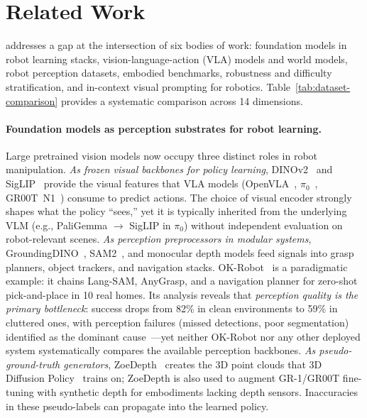 \section{Related Work}\label{sec:related}

\coolname{} addresses a gap at the intersection of six bodies of work: foundation models in robot learning stacks, vision-language-action (VLA) models and world models, robot perception datasets, embodied benchmarks, robustness and difficulty stratification, and in-context visual prompting for robotics.
Table~\ref{tab:dataset-comparison} provides a systematic comparison across 14 dimensions.

\paragraph{Foundation models as perception substrates for robot learning.}
Large pretrained vision models now occupy three distinct roles in robot manipulation.
%
\textit{As frozen visual backbones for policy learning}, DINOv2~\citep{oquab2023dinov2} and SigLIP~\citep{zhai2023siglip} provide the visual features that VLA models (OpenVLA~\citep{kim2024openvla}, $\pi_0$~\citep{black2024pi0}, GR00T~N1~\citep{bjorck2025gr00t}) consume to predict actions.
The choice of visual encoder strongly shapes what the policy ``sees,'' yet it is typically inherited from the underlying VLM (e.g., PaliGemma $\to$ SigLIP in $\pi_0$) without independent evaluation on robot-relevant scenes.
%
\textit{As perception preprocessors in modular systems}, GroundingDINO~\citep{liu2024groundingDINO}, SAM2~\citep{ravi2024sam2}, and monocular depth models feed signals into grasp planners, object trackers, and navigation stacks.
OK-Robot~\citep{liu2024okrobot} is a paradigmatic example: it chains Lang-SAM, AnyGrasp, and a navigation planner for zero-shot pick-and-place in 10 real homes.
Its analysis reveals that \textit{perception quality is the primary bottleneck}: success drops from 82\% in clean environments to 59\% in cluttered ones, with perception failures (missed detections, poor segmentation) identified as the dominant cause~\citep{liu2024okrobot}---yet neither OK-Robot nor any other deployed system systematically compares the available perception backbones.
%
\textit{As pseudo-ground-truth generators}, ZoeDepth~\citep{bhat2023zoedepth} creates the 3D point clouds that 3D Diffusion Policy~\citep{ze2024dp3} trains on; ZoeDepth is also used to augment GR-1/GR00T fine-tuning with synthetic depth for embodiments lacking depth sensors.
Inaccuracies in these pseudo-labels can propagate into the learned policy.

